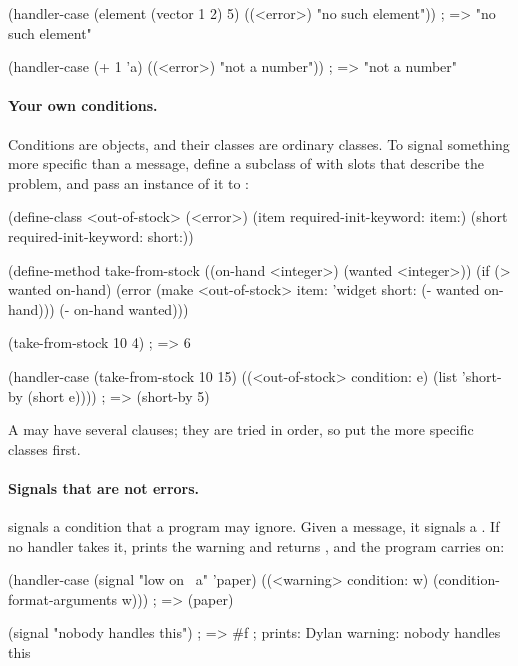 \begin{dylan}
(handler-case (element (vector 1 2) 5)
  ((<error>) "no such element"))    ; => "no such element"

(handler-case (+ 1 'a)
  ((<error>) "not a number"))       ; => "not a number"
\end{dylan}

\paragraph{Your own conditions.} Conditions are objects, and their classes
are ordinary classes. To signal something more specific than a message,
define a subclass of  with slots that describe the problem,
and pass an instance of it to :

\begin{dylan}
(define-class <out-of-stock> (<error>)
  (item  required-init-keyword: item:)
  (short required-init-keyword: short:))

(define-method take-from-stock ((on-hand <integer>) (wanted <integer>))
  (if (> wanted on-hand)
      (error (make <out-of-stock> item: 'widget short: (- wanted on-hand)))
      (- on-hand wanted)))

(take-from-stock 10 4)          ; => 6

(handler-case (take-from-stock 10 15)
  ((<out-of-stock> condition: e)
   (list 'short-by (short e))))  ; => (short-by 5)
\end{dylan}

A  may have several clauses; they are tried in order,
so put the more specific classes first.

\paragraph{Signals that are not errors.}
 signals a condition that a program may ignore. Given a
message, it signals a . If no handler takes it,
 prints the warning and returns , and the program
carries on:

\begin{dylan}
(handler-case (signal "low on ~a" 'paper)
  ((<warning> condition: w)
   (condition-format-arguments w)))   ; => (paper)

(signal "nobody handles this")    ; => #f
; prints: Dylan warning: nobody handles this
\end{dylan}

